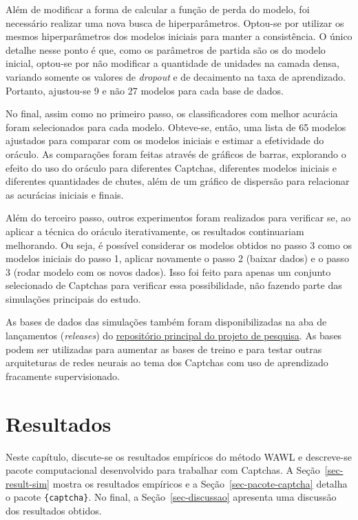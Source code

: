 \documentclass[12pt,twoside,brazilian]{book}
\begin{document}
Além de modificar a forma de calcular a função de perda do modelo, foi
necessário realizar uma nova busca de hiperparâmetros. Optou-se por
utilizar os mesmos hiperparâmetros dos modelos iniciais para manter a
consistência. O único detalhe nesse ponto é que, como os parâmetros de
partida são os do modelo inicial, optou-se por não modificar a
quantidade de unidades na camada densa, variando somente os valores de
\emph{dropout} e de decaimento na taxa de aprendizado. Portanto,
ajustou-se 9 e não 27 modelos para cada base de dados.

No final, assim como no primeiro passo, os classificadores com melhor
acurácia foram selecionados para cada modelo. Obteve-se, então, uma
lista de 65 modelos ajustados para comparar com os modelos iniciais e
estimar a efetividade do oráculo. As comparações foram feitas através de
gráficos de barras, explorando o efeito do uso do oráculo para
diferentes Captchas, diferentes modelos iniciais e diferentes
quantidades de chutes, além de um gráfico de dispersão para relacionar
as acurácias iniciais e finais.

Além do terceiro passo, outros experimentos foram realizados para
verificar se, ao aplicar a técnica do oráculo iterativamente, os
resultados continuariam melhorando. Ou seja, é possível considerar os
modelos obtidos no passo 3 como os modelos iniciais do passo 1, aplicar
novamente o passo 2 (baixar dados) e o passo 3 (rodar modelo com os
novos dados). Isso foi feito para apenas um conjunto selecionado de
Captchas para verificar essa possibilidade, não fazendo parte das
simulações principais do estudo.

As bases de dados das simulações também foram disponibilizadas na aba de
lançamentos (\emph{releases}) do
\href{https://github.com/jtrecenti/doutorado/releases}{repositório
principal do projeto de pesquisa}. As bases podem ser utilizadas para
aumentar as bases de treino e para testar outras arquiteturas de redes
neurais ao tema dos Captchas com uso de aprendizado fracamente
supervisionado.


\hypertarget{sec-results}{%
\chapter{Resultados}\label{sec-results}}


Neste capítulo, discute-se os resultados empíricos do método WAWL e
descreve-se pacote computacional desenvolvido para trabalhar com
Captchas. A Seção~\ref{sec-result-sim} mostra os resultados empíricos e
a Seção~\ref{sec-pacote-captcha} detalha o pacote \texttt{\{captcha\}}.
No final, a Seção~\ref{sec-discussao} apresenta uma discussão dos
resultados obtidos.
\end{document}
